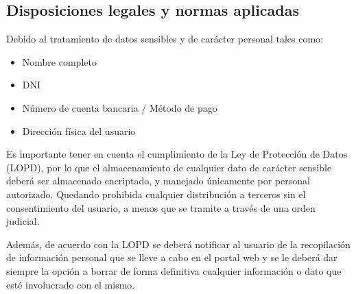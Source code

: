 \subsection{Disposiciones legales y normas aplicadas}
\par Debido al tratamiento de datos sensibles y de carácter personal tales como:
\begin{itemize}
	\item Nombre completo
	\item DNI
	\item Número de cuenta bancaria / Método de pago
	\item Dirección física del usuario
\end{itemize}
\par Es importante tener en cuenta el cumplimiento de la Ley de Protección de Datos (LOPD), por lo que el almacenamiento de cualquier dato de carácter sensible deberá ser almacenado encriptado, y manejado únicamente por personal autorizado. Quedando prohibida cualquier distribución a terceros sin el consentimiento del usuario, a menos que se tramite a través de una orden judicial.

\par Además, de acuerdo con la LOPD se deberá notificar al usuario de la recopilación de información personal que se lleve a cabo en el portal web y se le deberá dar siempre la opción a borrar de forma definitiva cualquier información o dato que esté involucrado con el mismo.
